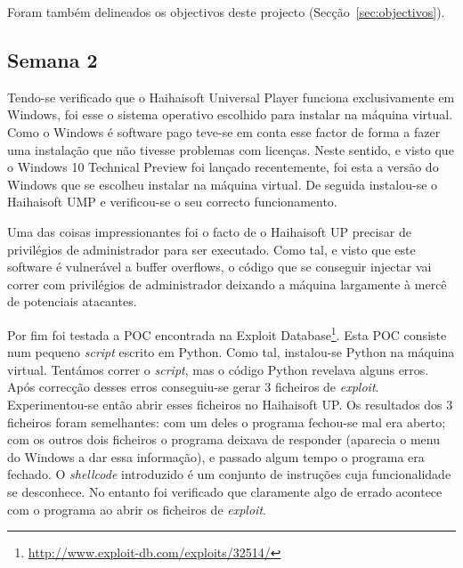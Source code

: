 \documentclass[11pt,a4paper]{article}
\begin{document}
Foram também delineados os objectivos deste projecto (Secção~\ref{sec:objectivos}).

\subsection{Semana 2}


Tendo-se verificado que o Haihaisoft Universal Player funciona exclusivamente em Windows, foi esse o sistema operativo escolhido para instalar na máquina virtual. Como o Windows é software pago teve-se em conta esse factor de forma a fazer uma instalação que não tivesse problemas com licenças. Neste sentido, e visto que o Windows 10 Technical Preview foi lançado recentemente, foi esta a versão do Windows que se escolheu instalar na máquina virtual. De seguida instalou-se o Haihaisoft UMP e verificou-se o seu correcto funcionamento.

Uma das coisas impressionantes foi o facto de o Haihaisoft UP precisar de privilégios de administrador para ser executado. Como tal, e visto que este software é vulnerável a buffer overflows, o código que se conseguir injectar vai correr com privilégios de administrador deixando a máquina largamente à mercê de potenciais atacantes.

Por fim foi testada a POC encontrada na Exploit Database\footnote{\url{http://www.exploit-db.com/exploits/32514/}}. Esta POC consiste num pequeno \textit{script} escrito em Python. Como tal, instalou-se Python na máquina virtual. Tentámos correr o \textit{script}, mas o código Python revelava alguns erros. Após correcção desses erros conseguiu-se gerar 3 ficheiros de \textit{exploit}. Experimentou-se então abrir esses ficheiros no Haihaisoft UP. Os resultados dos 3 ficheiros foram semelhantes: com um deles o programa fechou-se mal era aberto; com os outros dois ficheiros o programa deixava de responder (aparecia o menu do Windows a dar essa informação), e passado algum tempo o programa era fechado. O \textit{shellcode} introduzido é um conjunto de instruções cuja funcionalidade se desconhece. No entanto foi verificado que claramente algo de errado acontece com o programa ao abrir os ficheiros de \textit{exploit}.
\end{document}
